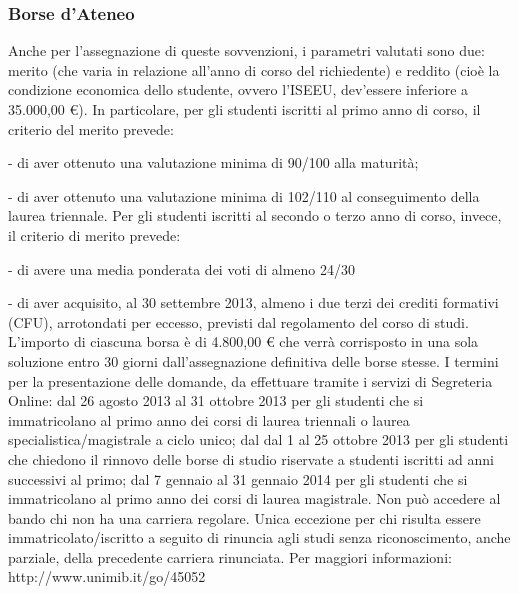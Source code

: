 \subsubsection{Borse d'Ateneo}
Anche per l'assegnazione di queste sovvenzioni, i parametri valutati sono due: merito (che varia in relazione all'anno di corso del richiedente) e reddito (cioè la condizione economica dello studente, ovvero l'ISEEU, dev'essere inferiore a 35.000,00 €). 
In particolare, per gli studenti iscritti al primo anno di corso, il criterio del merito prevede: 
   \item- di aver ottenuto una valutazione minima di 90/100 alla maturità; 
   \item- di aver ottenuto una valutazione minima di 102/110 al conseguimento della laurea triennale. 
Per gli studenti iscritti al secondo o terzo anno di corso, invece, il criterio di merito prevede: 
   \item- di avere una media ponderata dei voti di almeno 24/30 
   \item- di  aver acquisito, al 30 settembre 2013, almeno i  due terzi dei crediti formativi (CFU), arrotondati per eccesso, previsti dal regolamento del corso di studi. 
L'importo di ciascuna borsa è di 4.800,00 € che verrà corrisposto in una sola soluzione entro 30 giorni dall'assegnazione definitiva delle borse stesse.
I termini per la  presentazione delle domande, da effettuare tramite i servizi di Segreteria Online: dal 26 agosto 2013 al 31 ottobre 2013 per gli studenti che si immatricolano al primo anno dei corsi di laurea triennali o laurea specialistica/magistrale a ciclo unico; dal dal 1 al 25 ottobre 2013 per gli studenti che chiedono il rinnovo delle borse di studio riservate a studenti iscritti ad anni successivi al primo; dal 7 gennaio al 31 gennaio 2014 per gli studenti che si immatricolano al primo anno dei corsi di laurea magistrale. 
Non può accedere al bando chi non ha una carriera regolare. Unica eccezione per chi risulta essere immatricolato/iscritto a seguito di rinuncia agli studi senza riconoscimento, anche parziale, della precedente carriera rinunciata.
Per maggiori informazioni: http://www.unimib.it/go/45052
